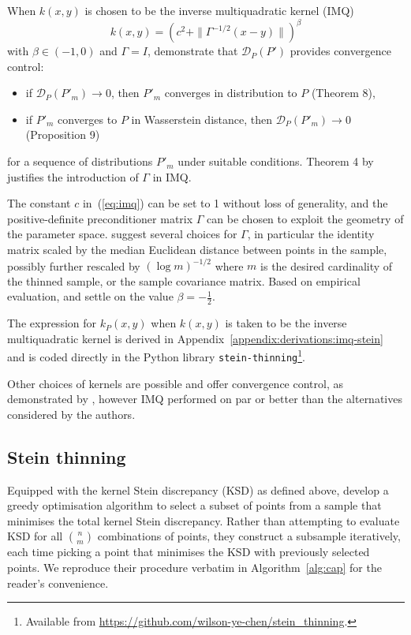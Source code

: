 \documentclass[11pt,a4paper]{report}
\begin{document}
When $k(x, y)$ is chosen to be the inverse multiquadratic kernel (IMQ)
\begin{equation}
k(x, y) = \left(c^2 + \|\Gamma^{-1/2}(x-y)\|\right)^\beta
\label{eq:imq}
\end{equation}
with $\beta \in (-1, 0)$ and $\Gamma = I$, \cite{gorhamMeasuringSampleQuality2017} demonstrate that $\mathcal{D}_{P}(P')$ provides convergence control:
\begin{itemize}
\item if $\mathcal{D}_{P}(P'_m) \to 0$, then $P'_m$ converges in distribution to $P$ (Theorem 8),
\item if $P'_m$ converges to $P$ in Wasserstein distance, then $\mathcal{D}_{P}(P'_m) \to 0$ (Proposition 9)
\end{itemize}
for a sequence of distributions $P'_m$ under suitable conditions. Theorem 4 by \cite{chenSteinPointMarkov2019} justifies the introduction of $\Gamma$ in IMQ.

The constant $c$ in~(\ref{eq:imq}) can be set to 1 without loss of generality, and the positive-definite preconditioner matrix $\Gamma$ can be chosen to exploit the geometry of the parameter space. \cite{riabizOptimalThinningMCMC2022} suggest several choices for $\Gamma$, in particular the identity matrix scaled by the median Euclidean distance between points in the sample, possibly further rescaled by $(\log m)^{-1/2}$ where $m$ is the desired cardinality of the thinned sample, or the sample covariance matrix. Based on empirical evaluation, \cite{gorhamMeasuringSampleQuality2017} and \cite{riabizOptimalThinningMCMC2022} settle on the value $\beta = -\frac12$.

The expression for $k_P(x, y)$ when $k(x, y)$ is taken to be the inverse multiquadratic kernel is derived in Appendix~\ref{appendix:derivations:imq-stein} and is coded directly in the Python library \texttt{stein-thinning}\footnote{Available from \url{https://github.com/wilson-ye-chen/stein_thinning}.}.

Other choices of kernels are possible and offer convergence control, as demonstrated by \cite{chenSteinPoints2018}, however IMQ performed on par or better than the alternatives considered by the authors.

\subsection{Stein thinning}
\label{sec:stein-thinning}

Equipped with the kernel Stein discrepancy (KSD) as defined above, \cite{riabizOptimalThinningMCMC2022} develop a greedy optimisation algorithm to select a subset of points from a sample that minimises the total kernel Stein discrepancy. Rather than attempting to evaluate KSD for all $n \choose m$ combinations of points, they construct a subsample iteratively, each time picking a point that minimises the KSD with previously selected points. We reproduce their procedure verbatim in Algorithm~\ref{alg:cap} for the reader's convenience. 
\end{document}
